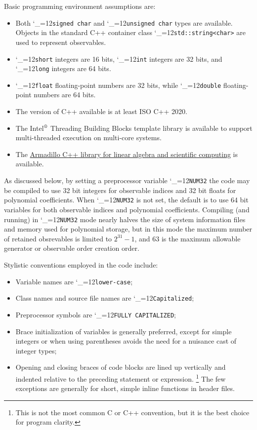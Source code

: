 \documentclass [12pt]{article}
\makeatletter
\renewcommand{\tt}{\begingroup\catcode`_=12\def\_{\string_}\tt@}
\newcommand{\tt@}[1]{\texttt{#1}\endgroup}
\makeatother
\begin{document}
Basic programming environment assumptions are:
\begin{itemize}\advance\itemsep -3pt
\item
    Both \tt{signed char} and \tt{unsigned char}
    types are available.
    Objects in the standard C++ container class
    \tt{std::string<char>} are used to
    represent observables.
\item
    \tt{short} integers are 16 bits,
    \tt{int} integers are 32 bits, and
    \tt{long} integers are 64 bits.
\item
    \tt{float} floating-point numbers are 32 bits, while
    \tt{double} floating-point numbers are 64 bits.
\item
    The version of C++ available is at least ISO C++ 2020.
\item
    The Intel$^{\text{\textregistered}}$ Threading Building Blocks template library
    \cite{IntelTBB}
    is available to support multi-threaded execution on multi-core systems.
\item
    The \href{https://arma.sourceforge.net}{Armadillo C++ library
    for linear algebra and scientific computing} is available.
\end{itemize}

As discussed below, by setting a preprocessor variable
\tt{NUM32} the code may be compiled to use 32 bit integers
for observable indices and 32 bit floats for polynomial coefficients.
When \tt{NUM32} is not set, the default is to use 64 bit
variables for both observable indices and polynomial coefficients.
Compiling (and running) in \tt{NUM32} mode nearly halves the size of
system information files and memory used for polynomial storage,
but in this mode the maximum number of retained obsrevables
is limited to $2^{31} - 1$, and 63 is the maximum allowable
generator or observable order creation order.

Stylistic conventions employed in the code include:
\begin{itemize}\advance\itemsep -3pt
\item
    Variable names are \tt{lower-case};
\item
    Class names and source file names are \tt{Capitalized};
\item
    Preprocessor symbols are \tt{FULLY CAPITALIZED};
\item
    Brace initialization of variables is generally preferred,
    except for simple integers or when using parentheses
    avoids the need for a nuisance cast of integer types;
\item
    Opening and closing braces of code blocks are lined up vertically
    and indented relative to the preceding statement or expression.%
    \footnote
	{
	This is not the most common C or C++ convention, but it is the best choice
	for program clarity.
	}
    The few exceptions are generally for short, simple inline functions in header files.
\end{itemize}
\end{document}
